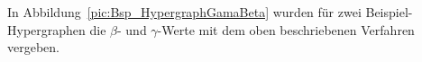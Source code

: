 
%

In Abbildung~\ref{pic:Bsp_HypergraphGamaBeta} wurden für zwei Beispiel-Hypergraphen die $\beta$- und $\gamma$-Werte mit dem oben beschriebenen Verfahren vergeben.

